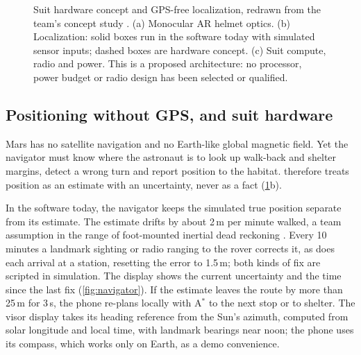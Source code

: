 \begin{figure}[t]
  \centering
  
  \caption{Suit hardware concept and GPS-free localization, redrawn from the team's concept study \citep{marswalkconcept2026}. (a) Monocular AR helmet optics. (b) Localization: solid boxes run in the software today with simulated sensor inputs; dashed boxes are hardware concept. (c) Suit compute, radio and power. This is a proposed architecture: no processor, power budget or radio design has been selected or qualified.}
  \label{fig:hardware}
\end{figure}

\subsection{Positioning without GPS, and suit hardware}
\label{sec:hardware}
Mars has no satellite navigation and no Earth-like global magnetic field. Yet the navigator must know where the astronaut is to look up walk-back and shelter margins, detect a wrong turn and report position to the habitat. \Marswalk therefore treats position as an estimate with an uncertainty, never as a fact (\cref{fig:hardware}b).

In the software today, the navigator keeps the simulated true position separate from its estimate. The estimate drifts by about 2\,m per minute walked, a team assumption in the range of foot-mounted inertial dead reckoning \citep{yamagishi2022pdr}. Every 10 minutes a landmark sighting or radio ranging to the rover corrects it, as does each arrival at a station, resetting the error to 1.5\,m; both kinds of fix are scripted in simulation. The display shows the current uncertainty and the time since the last fix (\cref{fig:navigator}). If the estimate leaves the route by more than 25\,m for 3\,s, the phone re-plans locally with A$^\ast$ to the next stop or to shelter. The visor display takes its heading reference from the Sun's azimuth, computed from solar longitude and local time, with landmark bearings near noon; the phone uses its compass, which works only on Earth, as a demo convenience.

